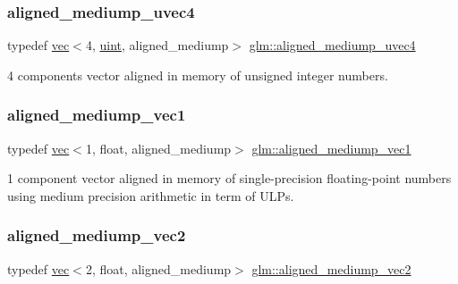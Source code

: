 \subsubsection{\texorpdfstring{aligned\+\_\+mediump\+\_\+uvec4}{aligned\_mediump\_uvec4}}
{\footnotesize\ttfamily typedef \hyperlink{structglm_1_1vec}{vec}$<$4, \hyperlink{group__core__precision_ga4fd29415871152bfb5abd588334147c8}{uint}, aligned\+\_\+mediump$>$ \hyperlink{group__gtc__type__aligned_gace9017071502bcfcd099532706881836}{glm\+::aligned\+\_\+mediump\+\_\+uvec4}}



4 components vector aligned in memory of unsigned integer numbers. 

\mbox{\label{group__gtc__type__aligned_ga8751a96bb361e9f007e5555eb90e3230}} 
\subsubsection{\texorpdfstring{aligned\+\_\+mediump\+\_\+vec1}{aligned\_mediump\_vec1}}
{\footnotesize\ttfamily typedef \hyperlink{structglm_1_1vec}{vec}$<$1, float, aligned\+\_\+mediump$>$ \hyperlink{group__gtc__type__aligned_ga8751a96bb361e9f007e5555eb90e3230}{glm\+::aligned\+\_\+mediump\+\_\+vec1}}



1 component vector aligned in memory of single-\/precision floating-\/point numbers using medium precision arithmetic in term of U\+L\+Ps. 

\mbox{\label{group__gtc__type__aligned_ga96e85f0817c2c6734af6c981ce2b3940}} 
\subsubsection{\texorpdfstring{aligned\+\_\+mediump\+\_\+vec2}{aligned\_mediump\_vec2}}
{\footnotesize\ttfamily typedef \hyperlink{structglm_1_1vec}{vec}$<$2, float, aligned\+\_\+mediump$>$ \hyperlink{group__gtc__type__aligned_ga96e85f0817c2c6734af6c981ce2b3940}{glm\+::aligned\+\_\+mediump\+\_\+vec2}}



